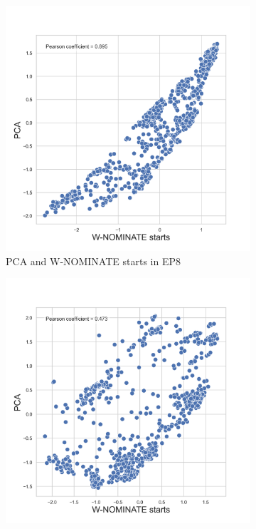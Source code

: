 \documentclass[a4paper,12pt]{report}
\begin{document}
    \begin{figure}[H]
        \centering
        \begin{subfigure}[b]{0.48\textwidth}
            \centering
            \includegraphics[width=\textwidth]{Graphs/Scatterstartspca8}
            \caption{PCA and W-NOMINATE starts in EP8}
            \label{fig:pca_SCATTER_8}
        \end{subfigure}
        \hfill
        \begin{subfigure}[b]{0.48\textwidth}
            \centering
            \includegraphics[width=\textwidth]{Graphs/Scatterstartspca9}

\end{subfigure}
\end{figure}
\end{document}

